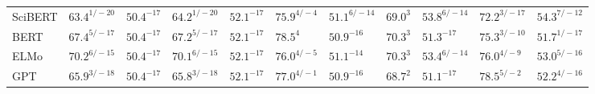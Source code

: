 \documentclass[letterpaper]{article} %
\begin{document}
\begin{table*}[ht]
\begin{tabular}{l l l l l l l l l l l}
SciBERT & $63.4^{1/-20}$ & $50.4^{-17}$ & $64.2^{1/-20}$ & $52.1^{-17}$ & $75.9^{4/-4}$ & $51.1^{6/-14}$ & $69.0^{3}$ & $53.8^{6/-14}$ & $72.2^{3/-17}$ & $54.3^{7/-12}$ \\
BERT & $67.4^{5/-17}$ & $50.4^{-17}$ & $67.2^{5/-17}$ & $52.1^{-17}$ & $78.5^{4}$ & $50.9^{-16}$ & $70.3^{3}$ & $51.3^{-17}$ & $75.3^{3/-10}$ & $51.7^{1/-17}$ \\
ELMo & $70.2^{6/-15}$ & $50.4^{-17}$ & $70.1^{6/-15}$ & $52.1^{-17}$ & $76.0^{4/-5}$ & $51.1^{-14}$ & $70.3^{3}$ & $53.4^{6/-14}$ & $76.0^{4/-9}$ & $53.0^{5/-16}$ \\
GPT & $65.9^{3/-18}$ & $50.4^{-17}$ & $65.8^{3/-18}$ & $52.1^{-17}$ & $77.0^{4/-1}$ & $50.9^{-16}$ & $68.7^{2}$ & $51.1^{-17}$ & $78.5^{5/-2}$ & $52.2^{4/-16}$ \\

\end{tabular}
\end{table*}
\end{document}
